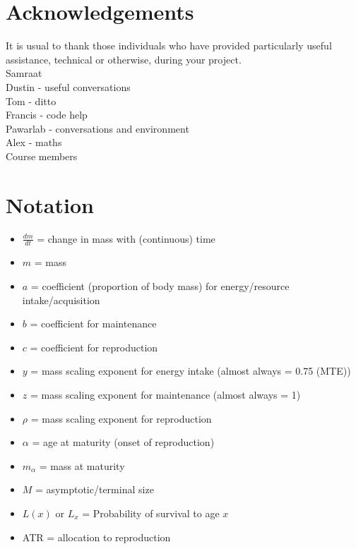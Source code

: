 \documentclass[a4paper]{article} %
\begin{document}
\section*{Acknowledgements}\thispagestyle{empty}
    It is usual to thank those individuals who have provided particularly useful assistance, technical or otherwise, during your project. \\
    Samraat \\
    Dustin - useful conversations \\
    Tom - ditto \\
    Francis - code help \\
    Pawarlab - conversations and environment \\
    Alex - maths \\
    Course members \\

\newpage\tableofcontents\thispagestyle{empty}

\newpage\listoffigures\thispagestyle{empty}

\newpage\listoftables\thispagestyle{empty}

\newpage\section*{Notation}\thispagestyle{empty}
\begin{itemize}    
    \item $\frac{dm}{dt}$ = change in mass with (continuous) time
    \item $m$ = mass
    \item $a$ = coefficient (proportion of body mass) for energy/resource intake/acquisition
    \item $b$ = coefficient for maintenance
    \item $c$ = coefficient for reproduction
    \item $y$ = mass scaling exponent for energy intake (almost always = 0.75 (MTE))
    \item $z$ = mass scaling exponent for maintenance (almost always = 1)
    \item $\rho$ = mass scaling exponent for reproduction
    \item $\alpha$ = age at maturity (onset of reproduction)
    \item $m_{\alpha}$ = mass at maturity
    \item $M$ = asymptotic/terminal size
    \item $L(x)$ or $L_x$ = Probability of survival to age $x$
    \item ATR = allocation to reproduction
\end{itemize}
\end{document}
